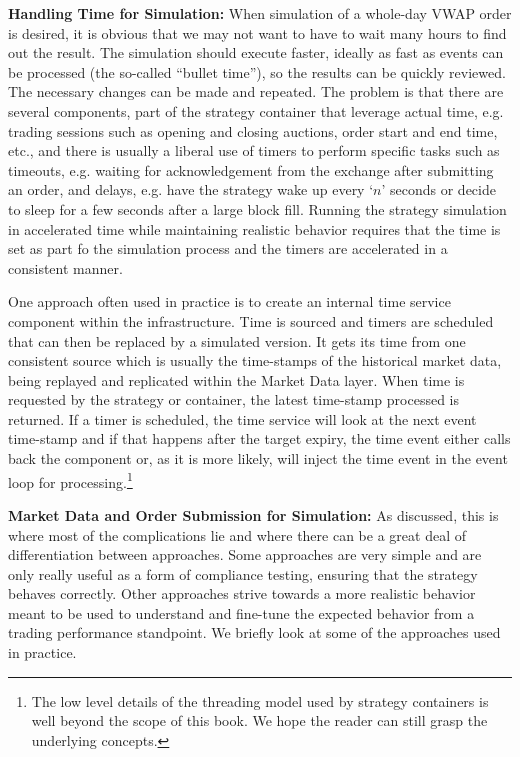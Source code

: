 \noindent\textbf{Handling Time for Simulation:}\label{in:sim_environ} When simulation of a whole-day VWAP order is desired, it is obvious that we may not want to have to wait many hours to find out the result. The simulation should execute faster, ideally as fast as events can be processed (the so-called ``bullet time''), so the results can be quickly reviewed. The necessary changes can be made and repeated. The problem is that there are several components, part of the strategy container that leverage actual time, e.g. trading sessions such as opening and closing auctions, order start and end time, etc., and there is usually a liberal use of timers to perform specific tasks such as timeouts, e.g. waiting for acknowledgement from the exchange after submitting an order, and delays, e.g. have the strategy wake up every `$n$' seconds or decide to sleep for a few seconds after a large block fill. Running the strategy simulation in accelerated time while maintaining realistic behavior requires that the time is set as part fo the simulation process and the timers are accelerated in a consistent manner.


One approach often used in practice is to create an internal time service component within the infrastructure. Time is sourced and timers are scheduled that can then be replaced by a simulated version. It gets its time from one consistent source which is usually the time-stamps of the historical market data, being replayed and replicated within the Market Data layer. When time is requested by the strategy or container, the latest time-stamp processed is returned. If a timer is scheduled, the time service will look at the next event time-stamp and if that happens after the target expiry, the time event either calls back the component or, as it is more likely, will inject the time event in the event loop for processing.\footnote{The low level details of the threading model used by strategy containers is well beyond the scope of this book. We hope the reader can still grasp the underlying concepts.} \twomedskip


\noindent\textbf{Market Data and Order Submission for Simulation:} As discussed, this is where most of the complications lie and where there can be a great deal of differentiation between approaches. Some approaches are very simple and are only really useful as a form of compliance testing, ensuring that the strategy behaves correctly. Other approaches strive towards a more realistic behavior meant to be used to understand and fine-tune the expected behavior from a trading performance standpoint. We briefly look at some of the approaches used in practice. \twomedskip


